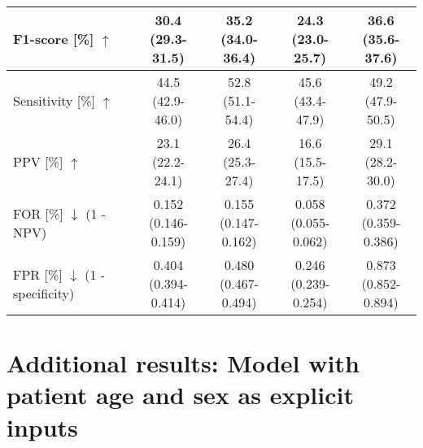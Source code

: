{\begin{table}
{\begin{tabular}{l|cc|cc}
        F1-score [\%] $\uparrow$                                 & \makecell[c]{30.4 \\ (29.3-31.5)} & \makecell[c]{35.2 \\ (34.0-36.4)} & \makecell[c]{24.3 \\ (23.0-25.7)} & \makecell[c]{36.6 \\ (35.6-37.6)} \\
        \midrule
        Sensitivity [\%] $\uparrow$                              & \makecell[c]{44.5 \\ (42.9-46.0)} & \makecell[c]{52.8 \\ (51.1-54.4)} & \makecell[c]{45.6 \\ (43.4-47.9)} & \makecell[c]{49.2 \\ (47.9-50.5)} \\
        \midrule
        PPV [\%] $\uparrow$                                      & \makecell[c]{23.1 \\ (22.2-24.1)} & \makecell[c]{26.4 \\ (25.3-27.4)} & \makecell[c]{16.6 \\ (15.5-17.5)} & \makecell[c]{29.1 \\ (28.2-30.0)} \\
        \midrule
        \makecell[l]{FOR [\%] $\downarrow$ \\ (1 - NPV)}         & \makecell[c]{0.152 \\ (0.146-0.159)} & \makecell[c]{0.155 \\ (0.147-0.162)} & \makecell[c]{0.058 \\ (0.055-0.062)} & \makecell[c]{0.372 \\ (0.359-0.386)} \\
        \midrule
        \makecell[l]{FPR [\%] $\downarrow$ \\ (1 - specificity)} & \makecell[c]{0.404 \\ (0.394-0.414)} & \makecell[c]{0.480 \\ (0.467-0.494)} & \makecell[c]{0.246 \\ (0.239-0.254)} & \makecell[c]{0.873 \\ (0.852-0.894)} \\

        \bottomrule
    \end{tabular}%
    }
\end{table}


\section{Additional results: Model with patient age and sex as explicit inputs}

}
